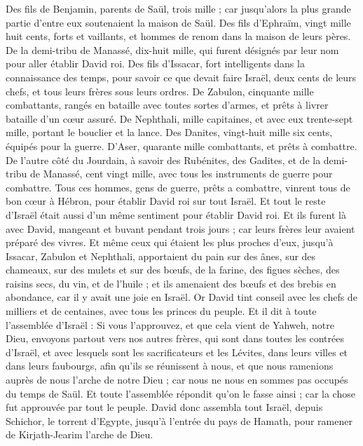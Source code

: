 \begin{multicols}{2}
Des fils de Benjamin, parents de Saül, trois mille ; car jusqu'alors la plus grande partie d'entre eux soutenaient la maison de Saül.
Des fils d'Ephraïm, vingt mille huit cents, forts et vaillants, et hommes de renom dans la maison de leurs pères.
De la demi-tribu de Manassé, dix-huit mille, qui furent désignés par leur nom pour aller établir David roi.
Des fils d'Issacar, fort intelligents dans la connaissance des temps, pour savoir ce que devait faire Israël, deux cents de leurs chefs, et tous leurs frères sous leurs ordres.
De Zabulon, cinquante mille combattants, rangés en bataille avec toutes sortes d'armes, et prêts à livrer bataille d'un cœur assuré.
De Nephthali, mille capitaines, et avec eux trente-sept mille, portant le bouclier et la lance.
Des Danites, vingt-huit mille six cents, équipés pour la guerre.
D'Aser, quarante mille combattants, et prêts à combattre.
De l'autre côté du Jourdain, à savoir des Rubénites, des Gadites, et de la demi-tribu de Manassé, cent vingt mille, avec tous les instruments de guerre pour combattre.
Tous ces hommes, gens de guerre, prêts a combattre, vinrent tous de bon cœur à Hébron, pour établir David roi sur tout Israël. Et tout le reste d'Israël était aussi d'un même sentiment pour établir David roi.
Et ils furent là avec David, mangeant et buvant pendant trois jours ; car leurs frères leur avaient préparé des vivres.
Et même ceux qui étaient les plus proches d'eux, jusqu'à Issacar, Zabulon et Nephthali, apportaient du pain sur des ânes, sur des chameaux, sur des mulets et sur des bœufs, de la farine, des figues sèches, des raisins secs, du vin, et de l'huile ; et ils amenaient des bœufs et des brebis en abondance, car il y avait une joie en Israël.
\VerseOne{}Or David tint conseil avec les chefs de milliers et de centaines, avec tous les princes du peuple.
Et il dit à toute l'assemblée d'Israël : Si vous l'approuvez, et que cela vient de Yahweh, notre Dieu, envoyons partout vers nos autres frères, qui sont dans toutes les contrées d'Israël, et avec lesquels sont les sacrificateurs et les Lévites, dans leurs villes et dans leurs faubourgs, afin qu'ils se réunissent à nous,
et que nous ramenions auprès de nous l'arche de notre Dieu ; car nous ne nous en sommes pas occupés du temps de Saül.
Et toute l'assemblée répondit qu'on le fasse ainsi ; car la chose fut approuvée par tout le peuple.
David donc assembla tout Israël, depuis Schichor, le torrent d'Egypte, jusqu'à l'entrée du pays de Hamath, pour ramener de Kirjath-Jearim l'arche de Dieu.

\end{multicols}
